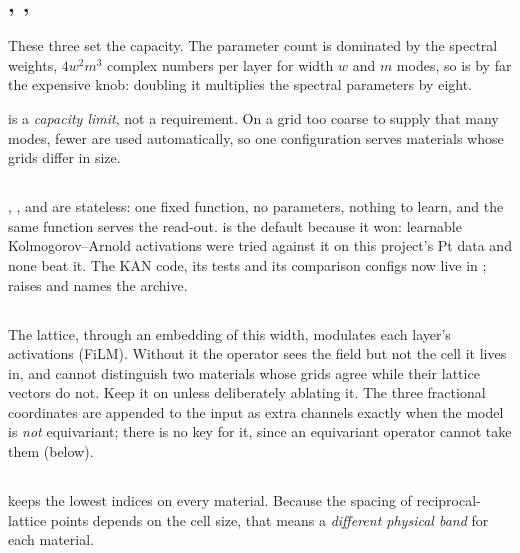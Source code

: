\subsection{, , }

These three set the capacity. The parameter count is dominated by the spectral weights, $4w^2m^3$ complex numbers per layer for width $w$ and $m$ modes, so  is by far the expensive knob: doubling it multiplies the spectral parameters by eight.

 is a \emph{capacity limit}, not a requirement. On a grid too coarse to supply that many modes, fewer are used automatically, so one configuration serves materials whose grids differ in size.

\subsection{}

, ,  and  are stateless: one fixed function, no parameters, nothing to learn, and the same function serves the read-out.  is the default because it won: learnable Kolmogorov--Arnold activations were tried against it on this project's Pt data and none beat it. The KAN code, its tests and its comparison configs now live in ;  raises and names the archive.

\subsection{}

The lattice, through an embedding of this width, modulates each layer's activations (FiLM). Without it the operator sees the field but not the cell it lives in, and cannot distinguish two materials whose grids agree while their lattice vectors do not. Keep it on unless deliberately ablating it. The three fractional coordinates are appended to the input as extra channels exactly when the model is \emph{not} equivariant; there is no key for it, since an equivariant operator cannot take them (below).

\subsection{}

 keeps the lowest  indices on every material. Because the spacing of reciprocal-lattice points depends on the cell size, that means a \emph{different physical band} for each material.

